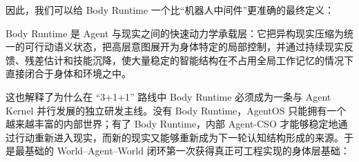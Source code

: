 因此，我们可以给 Body Runtime 一个比“机器人中间件”更准确的最终定义：
\begin{definition*}
Body Runtime 是 Agent 与现实之间的快速动力学承载层：它把异构现实压缩为统一的可行动语义状态，把高层意图展开为身体特定的局部控制，并通过持续现实反馈、残差估计和技能沉降，使大量稳定的智能结构在不占用全局工作记忆的情况下直接闭合于身体和环境之中。
\end{definition*}

这也解释了为什么在 ``3+1+1'' 路线中 Body Runtime 必须成为一条与 Agent Kernel 并行发展的独立研发主线。没有 Body Runtime，AgentOS 只能拥有一个越来越丰富的内部世界；有了 Body Runtime，内部 Agent-CSO 才能够稳定地通过行动重新进入现实，而新的现实又能够重新成为下一轮认知结构形成的来源。于是最基础的 World--Agent--World 闭环第一次获得真正可工程实现的身体层基础：
\begin{statementbox}
\centering
{}
\end{statementbox}
